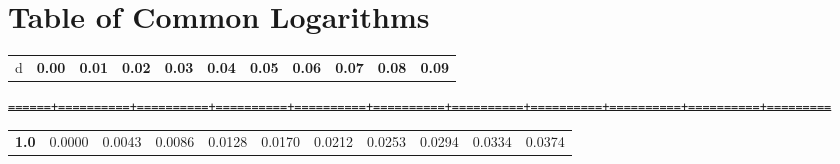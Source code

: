 \documentclass[margin=0.5in]{article}
\author{Michael Kovarik}
\date{\today}
\title{}
\begin{document}
\tableofcontents


\section{Table of Common Logarithms}
\label{sec:org9fc26be}


\begin{center}
\begin{tabular}{lllllllllll}
d & \textbf{0.00} & \textbf{0.01} & \textbf{0.02} & \textbf{0.03} & \textbf{0.04} & \textbf{0.05} & \textbf{0.06} & \textbf{0.07} & \textbf{0.08} & \textbf{0.09}\\
\end{tabular}
\end{center}
\sout{\texttt{======+==========+==========+==========+==========+==========+==========+==========+==========+==========+=========}}
\begin{center}
\begin{tabular}{lrrrrrrrrrr}
\textbf{1.0} & 0.0000 & 0.0043 & 0.0086 & 0.0128 & 0.0170 & 0.0212 & 0.0253 & 0.0294 & 0.0334 & 0.0374\\
\end{tabular}
\end{center}
\end{document}
